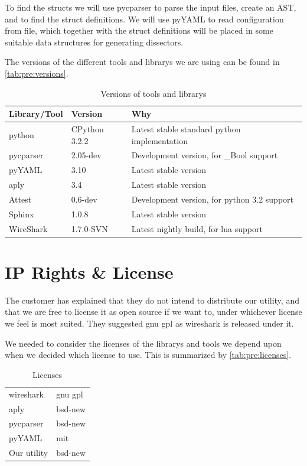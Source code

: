 To find the \glspl{struct} we will use \gls{pycparser} to parse the input files, create an
\gls{AST}, and to find the \gls{struct} definitions. We will use pyYAML to
read configuration from file, which together with the \gls{struct} definitions will
be placed in some suitable data structures for generating \glspl{dissector}.

The versions of the different tools and \glspl{library} we are using can be found in
\autoref{tab:pre:versions}.
\begin{table}[!h] \footnotesize \center
\vspace{-10pt}
\caption{Versions of tools and \glspl{library}\label{tab:pre:versions}}
\begin{tabular}{l l l}
	\toprule
	Library/Tool & Version & Why \\
	\midrule
	\Gls{python} & CPython 3.2.2 & Latest stable standard \Gls{python} implementation \\
	\gls{pycparser} & 2.05-dev & Development version, for \_Bool support \\
	pyYAML & 3.10 & Latest stable version \\
	\Gls{aply} & 3.4 & Latest stable version \\
	Attest & 0.6-dev & Development version, for \Gls{python} 3.2 support \\
	Sphinx & 1.0.8 & Latest stable version \\
	WireShark & 1.7.0-SVN & Latest nightly build, for \Gls{lua} support \\
	\bottomrule
\end{tabular}
\vspace{-10pt}
\end{table}


\section{IP Rights \& License}
\label{sec:pre:license}
The customer has explained that they do not intend to distribute our \gls{utility},
and that we are free to license it as open source if we want to, under
whichever license we feel is most suited. They suggested \gls{gnu} \Gls{gpl} as \Gls{wireshark}
is released under it.

We needed to consider the licenses of the \glspl{library} and tools we depend upon
when we decided which license to use. This is summarized by
\autoref{tab:pre:licenses}.
\begin{table}[!h] \footnotesize \center
\vspace{-20pt}
\caption{Licenses\label{tab:pre:licenses}}
\begin{tabular}{l l}
	\toprule
	\Gls{wireshark} & \gls{gnu} \Gls{gpl} \\
	\Gls{aply} & \Gls{bsd}-new \\
	\gls{pycparser} & \Gls{bsd}-new \\
	pyYAML & \Gls{mit} \\
	\midrule
	Our \gls{utility} & \Gls{bsd}-new \\
	\bottomrule
\end{tabular}
\vspace{-10pt}
\end{table}

